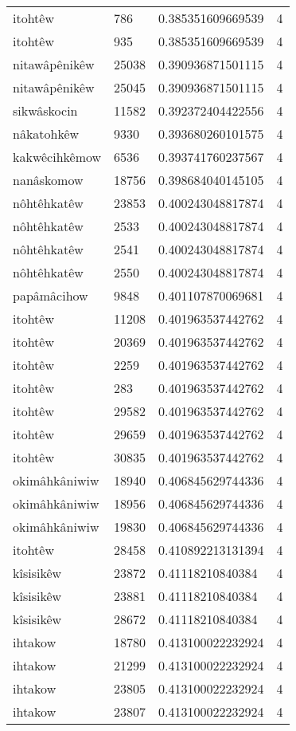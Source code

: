 \begin{longtable}{llll}
itohtêw & 786 & 0.385351609669539 & 4 \\
itohtêw & 935 & 0.385351609669539 & 4 \\
nitawâpênikêw & 25038 & 0.390936871501115 & 4 \\
nitawâpênikêw & 25045 & 0.390936871501115 & 4 \\
sikwâskocin & 11582 & 0.392372404422556 & 4 \\
nâkatohkêw & 9330 & 0.393680260101575 & 4 \\
kakwêcihkêmow & 6536 & 0.393741760237567 & 4 \\
nanâskomow & 18756 & 0.398684040145105 & 4 \\
nôhtêhkatêw & 23853 & 0.400243048817874 & 4 \\
nôhtêhkatêw & 2533 & 0.400243048817874 & 4 \\
nôhtêhkatêw & 2541 & 0.400243048817874 & 4 \\
nôhtêhkatêw & 2550 & 0.400243048817874 & 4 \\
papâmâcihow & 9848 & 0.401107870069681 & 4 \\
itohtêw & 11208 & 0.401963537442762 & 4 \\
itohtêw & 20369 & 0.401963537442762 & 4 \\
itohtêw & 2259 & 0.401963537442762 & 4 \\
itohtêw & 283 & 0.401963537442762 & 4 \\
itohtêw & 29582 & 0.401963537442762 & 4 \\
itohtêw & 29659 & 0.401963537442762 & 4 \\
itohtêw & 30835 & 0.401963537442762 & 4 \\
okimâhkâniwiw & 18940 & 0.406845629744336 & 4 \\
okimâhkâniwiw & 18956 & 0.406845629744336 & 4 \\
okimâhkâniwiw & 19830 & 0.406845629744336 & 4 \\
itohtêw & 28458 & 0.410892213131394 & 4 \\
kîsisikêw & 23872 & 0.41118210840384 & 4 \\
kîsisikêw & 23881 & 0.41118210840384 & 4 \\
kîsisikêw & 28672 & 0.41118210840384 & 4 \\
ihtakow & 18780 & 0.413100022232924 & 4 \\
ihtakow & 21299 & 0.413100022232924 & 4 \\
ihtakow & 23805 & 0.413100022232924 & 4 \\
ihtakow & 23807 & 0.413100022232924 & 4 \\

\end{longtable}
